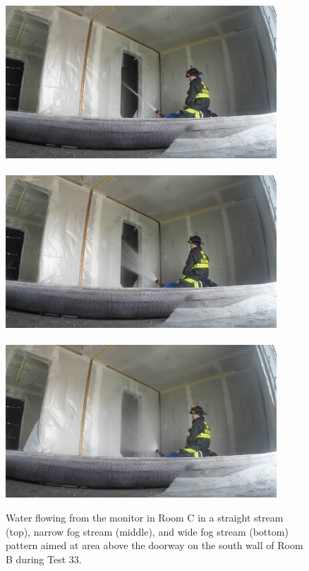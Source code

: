 \documentclass[12pt,oneside]{book}
\begin{document}
\begin{figure}[!ht]
	\includegraphics[trim=16cm 6.25cm 9cm 6cm, clip=true, width=4in]{../Figures/Pictures/SS_Room_B_Test_33}
	\\~\\
	\includegraphics[trim=16cm 6.25cm 9cm 6cm, clip=true, width=4in]{../Figures/Pictures/NF_Room_B_Test_33}
	\\~\\
	\includegraphics[trim=16cm 6.25cm 9cm 6cm, clip=true, width=4in]{../Figures/Pictures/WF_Room_B_Test_33}
	\caption[Straight stream, narrow fog stream, and wide fog stream during Test 33.]{Water flowing from the monitor in Room C in a straight stream (top), narrow fog stream (middle), and wide fog stream (bottom) pattern aimed at area above the doorway on the south wall of Room B during Test 33.}
	\label{fig:test_33_pic}
\end{figure}
\end{document}
